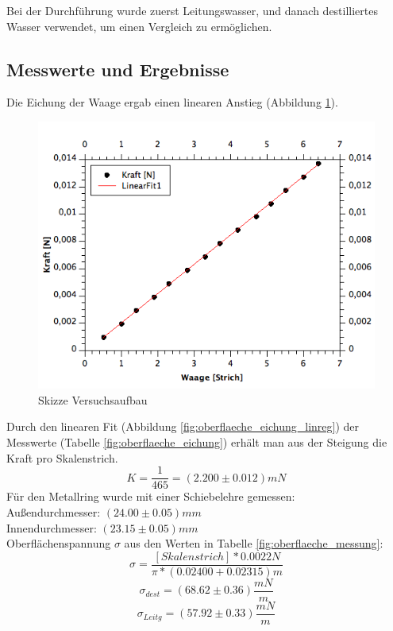 \documentclass[12pt,a4paper]{article}
\begin{document}
\begin{multicols}{2}
\noindent Bei der Durchführung wurde zuerst Leitungswasser, und danach destilliertes Wasser verwendet, um einen Vergleich zu ermöglichen.

\subsection{Messwerte und Ergebnisse}
Die Eichung der Waage ergab einen linearen Anstieg (Abbildung \ref{fig:oberflaeche_eichung_fit}). 

\begin{figure}[H]
	\centering
	\includegraphics[scale=0.45]{./figure/Waageneichung-Fit 02.png}
	\caption{Skizze Versuchsaufbau}
	\label{fig:oberflaeche_eichung_fit}
\end{figure}




\noindent
Durch den linearen Fit (Abbildung \ref{fig:oberflaeche_eichung_linreg}) der Messwerte (Tabelle \ref{fig:oberflaeche_eichung}) erhält man aus der Steigung die Kraft pro Skalenstrich. 
$$K = \frac{1}{465} = (2.200\pm 0.012)mN$$ 
Für den Metallring wurde mit einer Schiebelehre gemessen:\\
Außendurchmesser: $(24.00 \pm 0.05)mm$\\
Innendurchmesser: $(23.15 \pm 0.05)mm$\\

Oberflächenspannung $\sigma$ aus den Werten in Tabelle \ref{fig:oberflaeche_messung}:
$$\sigma = \frac{[Skalenstrich] * 0.0022N}{\pi * (0.02400 + 0.02315)m} $$ 
$$\sigma_{dest}= (68.62 \pm 0.36) \frac{mN}{m}$$ %
$$ \sigma_{Leitg} = (57.92 \pm 0.33) \frac{mN}{m}$$




\end{multicols}
\end{document}
